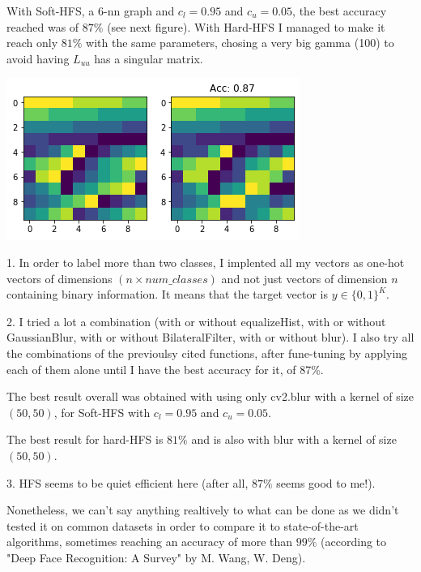 \documentclass{article}
\begin{document}
With Soft-HFS, a 6-nn graph and $c_l=0.95$ and $c_u=0.05$, the best accuracy reached was of $87\%$ (see next figure). 
With Hard-HFS I managed to make it reach only $81\%$ with the same parameters, chosing a very big gamma (100) to avoid having $L_{uu}$ has a singular matrix.

\begin{center}
	\includegraphics[scale=0.7]{5}
\end{center}

1. In order to label more than two classes, I implented all my vectors as one-hot vectors of dimensions $(n \times num\_classes)$ and not just vectors of dimension $n$ containing binary information. It means that the target vector is $y \in \{0,1\}^K$.
\\ \newline 


2. I tried a lot a combination (with or without equalizeHist, with or without GaussianBlur, with or without BilateralFilter, with or without blur). I also try all the combinations of the previoulsy cited functions, after fune-tuning by applying each of them alone until I have the best accuracy for it, of 87\%. 

The best result overall was obtained with using only cv2.blur with a kernel of size $(50,50)$, for Soft-HFS with $c_l=0.95$ and $c_u=0.05$.

The best result for hard-HFS is $81\%$ and is also with blur with a kernel of size $(50,50)$.
\\ \newline 


3. HFS seems to be quiet efficient here (after all, $87\%$ seems good to me!). 

Nonetheless, we can't say anything realtively to what can be done as we didn't tested it on common datasets in order to compare it to state-of-the-art algorithms, sometimes reaching an accuracy of more than $99\%$ (according to "Deep Face Recognition: A Survey" by M. Wang, W. Deng).
\\ \newline 
\end{document}
